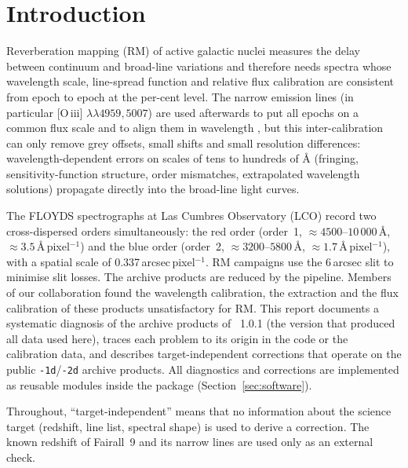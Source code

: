 \section{Introduction}
\label{sec:intro}

Reverberation mapping (RM) of active galactic nuclei measures the delay between continuum and broad-line variations
and therefore needs spectra whose wavelength scale, line-spread function and relative flux calibration are
consistent from epoch to epoch at the per-cent level. The narrow emission lines (in particular [O\,{\sc iii}]
$\lambda\lambda4959,5007$) are used afterwards to put all epochs on a common flux scale and to align them in
wavelength \citep{vanGroningen1992,Fausnaugh2017}, but this inter-calibration can only remove grey
offsets, small shifts and small resolution differences: wavelength-dependent errors on scales of tens to hundreds of
\AA{} (fringing, sensitivity-function structure, order mismatches, extrapolated wavelength solutions) propagate
directly into the broad-line light curves.

The FLOYDS spectrographs at Las Cumbres Observatory (LCO) record two cross-dispersed orders simultaneously: the red
order (order~1, $\approx4500$--$10\,000$\,\AA, $\approx3.5$\,\AA\,pixel$^{-1}$) and the blue order (order~2,
$\approx3200$--$5800$\,\AA, $\approx1.7$\,\AA\,pixel$^{-1}$), with a spatial scale of 0.337\,arcsec\,pixel$^{-1}$.
RM campaigns use the 6\,arcsec slit to minimise slit losses. The archive products are reduced by the
\banzai{} pipeline. Members of our collaboration found the wavelength calibration, the extraction and the flux
calibration of these products unsatisfactory for RM. This report documents a systematic diagnosis of the archive
products of \banzai{}~1.0.1 (the version that produced all data used here), traces each problem to its origin in the
code or the calibration data, and describes target-independent corrections that operate on the public
\texttt{-1d}/\texttt{-2d} archive products. All diagnostics and corrections are implemented as reusable modules
inside the \banzai{} package (Section~\ref{sec:software}).

Throughout, ``target-independent'' means that no information about the science target (redshift, line list, spectral
shape) is used to derive a correction. The known redshift of Fairall~9 and its narrow lines are used only as an
external check.
